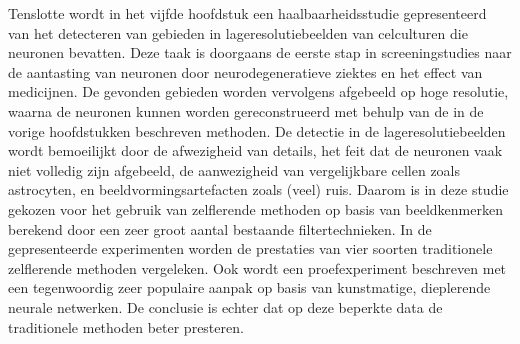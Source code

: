 Tenslotte wordt in het vijfde hoofdstuk een haalbaarheidsstudie gepresenteerd van het detecteren van gebieden in lageresolutiebeelden van celculturen die neuronen bevatten. Deze taak is doorgaans de eerste stap in screeningstudies naar de aantasting van neuronen door neurodegeneratieve ziektes en het effect van medicijnen. De gevonden gebieden worden vervolgens afgebeeld op hoge resolutie, waarna de neuronen kunnen worden gereconstrueerd met behulp van de in de vorige hoofdstukken beschreven methoden. De detectie in de lageresolutiebeelden wordt bemoeilijkt door de afwezigheid van details, het feit dat de neuronen vaak niet volledig zijn afgebeeld, de aanwezigheid van vergelijkbare cellen zoals astrocyten, en beeldvormingsartefacten zoals (veel) ruis. Daarom is in deze studie gekozen voor het gebruik van zelflerende methoden op basis van beeldkenmerken berekend door een zeer groot aantal bestaande filtertechnieken. In de gepresenteerde experimenten worden de prestaties van vier soorten traditionele zelflerende methoden vergeleken. Ook wordt een proefexperiment beschreven met een tegenwoordig zeer populaire aanpak op basis van kunstmatige, dieplerende neurale netwerken. De conclusie is echter dat op deze beperkte data de traditionele methoden beter presteren.


